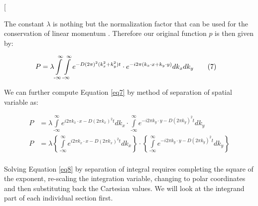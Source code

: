 \twocolumn[\begin{@twocolumnfalse}

The constant $\lambda$ is nothing but the normalization factor that can be used for the conservation of linear momentum \cite{Ursell2005}. Therefore our original function $p$ is then given by:

\begin{align*}
    P &=\lambda\int\limits^{\infty}_{\text{-}\infty}\int\limits^{\infty}_{\text{-}\infty} e^{-D (2\pi)^2 (k_x^2 + k_y^2) t}\cdot e^{-i 2\pi (k_x \cdot x + k_y \cdot y )}dk_x dk_y \tag{7}
    \label{eq7}  
\end{align*}

We can further compute Equation \eqref{eq7} by method of separation of spatial variable as:

\begin{align*}
    P &= \lambda \int\limits^{\infty}_{\text{-}\infty} e^{i 2\pi k_x \cdot x-D (2 \pi k_x)^2 t}dk_x \cdot \int\limits^{\infty}_{\text{-}\infty} e^{-i 2\pi k_y \cdot y-D (2 \pi k_y)^2 t}dk_y  \\
    P &= \lambda \left\{ \int\limits^{\infty}_{\text{-}\infty} e^{i 2\pi k_x \cdot x-D (2 \pi k_x)^2 t}dk_x \right \} \cdot  \left\{ \int\limits^{\infty}_{\text{-}\infty} e^{-i 2\pi k_y \cdot y-D (2 \pi k_y)^2 t}dk_y \right \} \tag{8}
    \label{eq8}  \\
\end{align*}

Solving Equation \eqref{eq8} by separation of integral requires completing the square of the exponent, re-scaling the integration variable, changing to polar coordinates and then substituting back the Cartesian values. We will look at the integrand part of each individual section first.  


\end{@twocolumnfalse}
